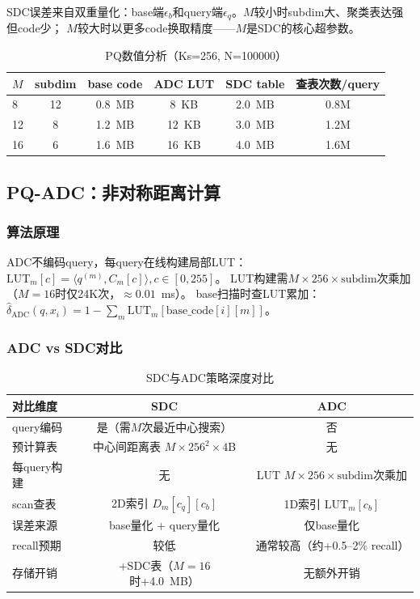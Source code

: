 \documentclass[11pt,a4paper]{article}
\begin{document}
SDC误差来自双重量化：base端$\epsilon_b$和query端$\epsilon_q$。$M$较小时subdim大、聚类表达强但code少；
$M$较大时以更多code换取精度——$M$是SDC的核心超参数。

\begin{table}[H]
\centering
\caption{PQ数值分析（Ks=256, N=100000）}
\label{tab:pq_num}
\small
\begin{tabular}{lccccc}
\toprule
$M$ & subdim & base code & ADC LUT & SDC table & 查表次数/query \\
\midrule
8  & 12 & 0.8~MB  & 8~KB  & 2.0~MB & 0.8M \\
12 & 8  & 1.2~MB  & 12~KB & 3.0~MB & 1.2M \\
16 & 6  & 1.6~MB  & 16~KB & 4.0~MB & 1.6M \\
\bottomrule
\end{tabular}
\end{table}

\subsection{PQ-ADC：非对称距离计算}

\subsubsection{算法原理}

ADC不编码query，每query在线构建局部LUT：
$\text{LUT}_m[c] = \langle q^{(m)}, C_m[c] \rangle, c \in [0, 255]$。
LUT构建需$M\times 256\times\text{subdim}$次乘加（$M=16$时仅24K次，$\approx 0.01$~ms）。
base扫描时查LUT累加：$\hat{\delta}_{\text{ADC}}(q, x_i) = 1 - \sum_m \text{LUT}_m[\text{base\_code}[i][m]]$。

\subsubsection{ADC vs SDC对比}

\begin{table}[H]
\centering
\caption{SDC与ADC策略深度对比}
\label{tab:sdc_adc_cmp}
\small
\begin{tabular}{lcc}
\toprule
\textbf{对比维度} & \textbf{SDC} & \textbf{ADC} \\
\midrule
query编码 & 是（需$M$次最近中心搜索） & 否 \\
预计算表 & 中心间距离表 $M\times 256^2\times 4$B & 无 \\
每query构建 & 无 & LUT $M\times 256\times\text{subdim}$次乘加 \\
scan查表 & 2D索引 $D_m[c_q][c_b]$ & 1D索引 $\text{LUT}_m[c_b]$ \\
误差来源 & base量化 + query量化 & 仅base量化 \\
recall预期 & 较低 & 通常较高（约+0.5--2\% recall）\\
存储开销 & +SDC表（$M=16$时+4.0~MB）& 无额外开销 \\
\bottomrule
\end{tabular}
\end{table}
\end{document}
